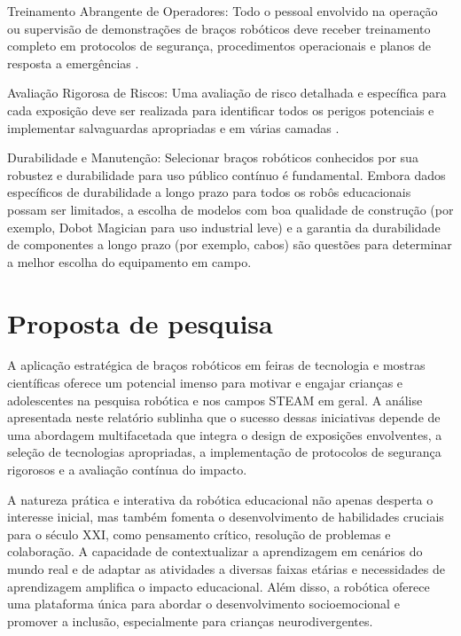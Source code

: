 \documentclass[%
  12pt,%
  a4paper,%
  oneside,%
  openright,%
  sumario = abnt-6027-2012,%
  chapter = TITLE,%
  pretextualoneside,%
  fontetimes,%
  semrecuonosumario,%
  usemakeindex,%
  pardeassinaturas,%
  english,%
  french,%
  spanish,%
  brazil,%
]{utfpr}%
\begin{document}
\begin{description}
		\item Treinamento Abrangente de Operadores: Todo o pessoal envolvido na operação ou supervisão de demonstrações de braços robóticos deve receber treinamento completo em protocolos de segurança, procedimentos operacionais e planos de resposta a emergências \cite{kinovaJacoAssistiveTechnologies2025}.
		\item Avaliação Rigorosa de Riscos: Uma avaliação de risco detalhada e específica para cada exposição deve ser realizada para identificar todos os perigos potenciais e implementar salvaguardas apropriadas e em várias camadas \cite{top3dshopDobotMagicianReview2023}.
		\item Durabilidade e Manutenção: Selecionar braços robóticos conhecidos por sua robustez e durabilidade para uso público contínuo é fundamental. Embora dados específicos de durabilidade a longo prazo para todos os robôs educacionais possam ser limitados, a escolha de modelos com boa qualidade de construção (por exemplo, Dobot Magician para uso industrial leve) \cite{robotlabDobotClassroomPack2025} e a garantia da durabilidade de componentes a longo prazo (por exemplo, cabos) \cite{bostonDynamicsSpot2025} são questões para determinar a melhor escolha do equipamento em campo.
	\end{description}
	

\chapter{Proposta de pesquisa}
A aplicação estratégica de braços robóticos em feiras de tecnologia e mostras científicas oferece um potencial imenso para motivar e engajar crianças e adolescentes na pesquisa robótica e nos campos STEAM em geral. A análise apresentada neste relatório sublinha que o sucesso dessas iniciativas depende de uma abordagem multifacetada que integra o design de exposições envolventes, a seleção de tecnologias apropriadas, a implementação de protocolos de segurança rigorosos e a avaliação contínua do impacto.

A natureza prática e interativa da robótica educacional não apenas desperta o interesse inicial, mas também fomenta o desenvolvimento de habilidades cruciais para o século XXI, como pensamento crítico, resolução de problemas e colaboração. A capacidade de contextualizar a aprendizagem em cenários do mundo real e de adaptar as atividades a diversas faixas etárias e necessidades de aprendizagem amplifica o impacto educacional. Além disso, a robótica oferece uma plataforma única para abordar o desenvolvimento socioemocional e promover a inclusão, especialmente para crianças neurodivergentes.
\end{document}
